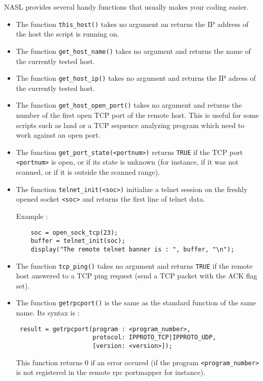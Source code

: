 \documentclass{article}
\begin{document}
NASL provides several handy functions that usually makes your coding easier.
\begin{itemize}
\item The function \verb+this_host()+ takes no argument an returns the IP address
of the host the script is running on.

\item The function \verb+get_host_name()+ takes no argument and returns the
name of the currently tested host.

\item The function \verb+get_host_ip()+ takes no argument and returns the
IP adress of the currently tested host.

\item The function \verb+get_host_open_port()+ takes no argument and returns the
number of the first open TCP port of the remote host. This is useful for some
scripts such as land or a TCP sequence analyzing program which need to work
against an open port.


\item The function \verb+get_port_state(<portnum>)+ returns \verb+TRUE+ if the TCP port
\verb+<portnum>+ is open, or if its state is unknown (for instance, if it was not scanned,
or if it is outside the scanned range).


\item The function \verb+telnet_init(<soc>)+ initialize a telnet session
on the freshly opened socket \verb+<soc>+ and returns the first line of telnet
data. 

Example :

\begin{verbatim}
	soc = open_sock_tcp(23);
	buffer = telnet_init(soc);
	display("The remote telnet banner is : ", buffer, "\n");
\end{verbatim}

\item The function \verb+tcp_ping()+ takes no argument and returns
\verb+TRUE+ if the remote host answered to a TCP ping request (send a TCP packet
with the ACK flag set).


\item The function \verb+getrpcport()+ is the same as the standard function of
the same name. Its syntax is :
\begin{verbatim}
 result = getrpcport(program : <program_number>,
                     protocol: IPPROTO_TCP|IPPROTO_UDP,
                     [version: <version>]);
\end{verbatim}

This function returns 0 if an error occured (if the program \verb+<program_number>+ is not
registered in the remote rpc portmapper for instance).

\end{itemize}		    
	
\end{document}
